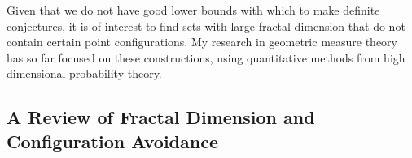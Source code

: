 \documentclass[11pt]{article}
\DeclareMathOperator{\RR}{\mathbb{R}}
\begin{document}
Given that we do not have good lower bounds with which to make definite conjectures, it is of interest to find sets with large fractal dimension that do not contain certain point configurations. My research in geometric measure theory has so far focused on these constructions, using quantitative methods from high dimensional probability theory.

\subsection{A Review of Fractal Dimension and Configuration Avoidance}


\end{document}
